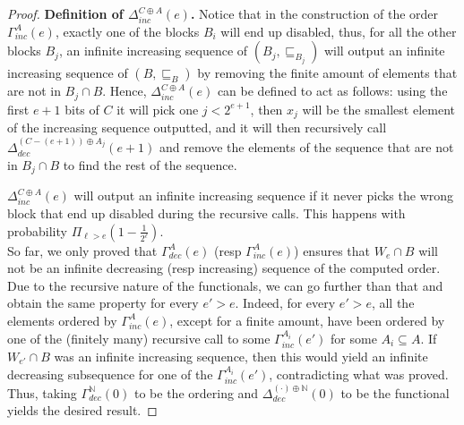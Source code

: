 \documentclass{article}
\numberwithin{theorem}{section}
\newcommand{\NN}[0]{\mathbb{N}}
\begin{document}
\begin{proof}
\textbf{Definition of $\Delta^{C \oplus A}_{inc}(e)$.}
Notice that in the construction of the order $\Gamma^A_{inc}(e)$, exactly one of the blocks $B_i$ will end up disabled, thus, for all the other blocks $B_j$, an infinite increasing sequence of $(B_j, \sqsubseteq_{B_j})$ will output an infinite increasing sequence of $(B, \sqsubseteq_B)$ by removing the finite amount of elements that are not in $B_j \cap B$. Hence, $\Delta^{C \oplus A}_{inc}(e)$ can be defined to act as follows: using the first $e+1$ bits of $C$ it will pick one $j < 2^{e+1}$, then $x_j$ will be the smallest element of the increasing sequence outputted, and it will then recursively call $\Delta^{(C - (e + 1)) \oplus A_j}_{dec}(e+1)$ and remove the elements of the sequence that are not in $B_j \cap B$ to find the rest of the sequence.

$\Delta^{C \oplus A}_{inc}(e)$ will output an infinite increasing sequence if it never picks the wrong block that end up disabled during the recursive calls. This happens with probability $\Pi_{\ell > e} (1 - \frac{1}{2^{\ell}})$. \\

So far, we only proved that $\Gamma^{A}_{dec}(e)$ (resp $\Gamma^{A}_{inc}(e)$) ensures that $W_e \cap B$ will not be an infinite decreasing (resp increasing) sequence of the computed order. Due to the recursive nature of the functionals, we can go further than that and obtain the same property for every $e' > e$. Indeed, for every $e' > e$, all the elements ordered by $\Gamma^{A}_{inc}(e)$, except for a finite amount, have been ordered by one of the (finitely many) recursive call to some $\Gamma^{A_i}_{inc}(e')$ for some $A_i \subseteq A$. If $W_{e'} \cap B$ was an infinite increasing sequence, then this would yield an infinite decreasing subsequence for one of the $\Gamma^{A_i}_{inc}(e')$, contradicting what was proved. \\

Thus, taking $\Gamma_{dec}^{\NN}(0)$ to be the ordering and $\Delta^{(\cdot) \oplus \NN}_{dec}(0)$ to be the functional yields the desired result.
\end{proof}
\end{document}
